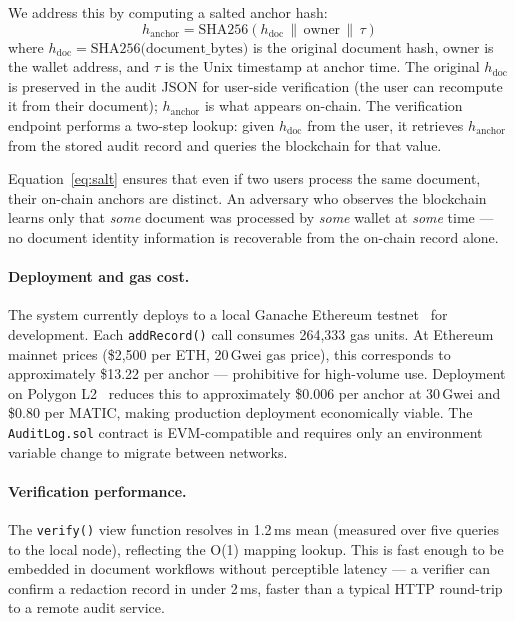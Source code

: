 We address this by computing a salted anchor hash:
\begin{equation}
  h_{\text{anchor}} = \text{SHA256}(h_{\text{doc}}
    \,\|\, \text{owner} \,\|\, \tau)
  \label{eq:salt}
\end{equation}
where $h_{\text{doc}} = \text{SHA256(document\_bytes)}$
is the original document hash, $\text{owner}$ is the
wallet address, and $\tau$ is the Unix timestamp at
anchor time.
The original $h_{\text{doc}}$ is preserved in the
audit JSON for user-side verification (the user can
recompute it from their document);
$h_{\text{anchor}}$ is what appears on-chain.
The verification endpoint performs a two-step lookup:
given $h_{\text{doc}}$ from the user, it retrieves
$h_{\text{anchor}}$ from the stored audit record and
queries the blockchain for that value.

Equation~\ref{eq:salt} ensures that even if two users
process the same document, their on-chain anchors are
distinct.
An adversary who observes the blockchain learns only
that \emph{some} document was processed by
\emph{some} wallet at \emph{some} time --- no
document identity information is recoverable from
the on-chain record alone.

\paragraph{Deployment and gas cost.}
The system currently deploys to a local Ganache
Ethereum testnet~\cite{ganache} for development.
Each \texttt{addRecord()} call consumes 264,333 gas
units.
At Ethereum mainnet prices (\$2,500 per ETH, 20\,Gwei
gas price), this corresponds to approximately
\$13.22 per anchor --- prohibitive for high-volume
use.
Deployment on Polygon L2~\cite{polygon2021} reduces
this to approximately \$0.006 per anchor at 30\,Gwei
and \$0.80 per MATIC, making production deployment
economically viable.
The \texttt{AuditLog.sol} contract is EVM-compatible
and requires only an environment variable change to
migrate between networks.

\paragraph{Verification performance.}
The \texttt{verify()} view function resolves in
1.2\,ms mean (measured over five queries to the local
node), reflecting the O(1) mapping lookup.
This is fast enough to be embedded in document
workflows without perceptible latency --- a verifier
can confirm a redaction record in under 2\,ms,
faster than a typical HTTP round-trip to a remote
audit service.

